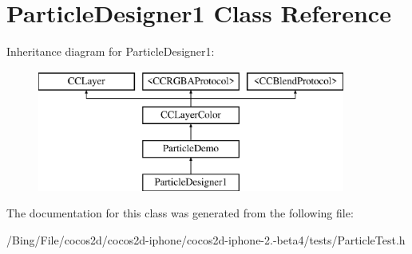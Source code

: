 \hypertarget{interface_particle_designer1}{\section{Particle\-Designer1 Class Reference}
\label{interface_particle_designer1}
}
Inheritance diagram for Particle\-Designer1\-:\begin{figure}[H]
\begin{center}
\leavevmode
\includegraphics[height=4.000000cm]{interface_particle_designer1}
\end{center}
\end{figure}


The documentation for this class was generated from the following file\-:\begin{DoxyCompactItemize}
\item 
/\-Bing/\-File/cocos2d/cocos2d-\/iphone/cocos2d-\/iphone-\/2.-\/beta4/tests/Particle\-Test.\-h\end{DoxyCompactItemize}
